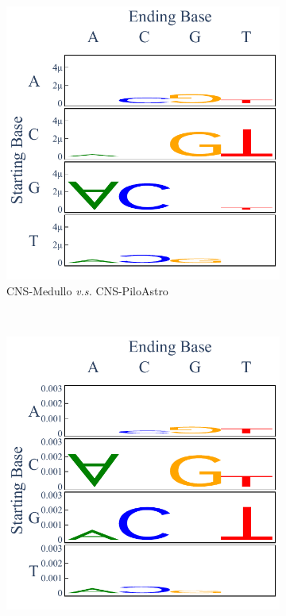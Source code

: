 \begin{figure}[ht!]
    \begin{subfigure}{.5\textwidth}
    \includegraphics[scale=0.7]{graphics/spectra_CNS-Medullo_CNS-PiloAstro.pdf}
    \caption{CNS-Medullo \textit{v.s.} CNS-PiloAstro}
    \label{fig:spectra_medullo_piloastro}
    \end{subfigure}
    ~
    \begin{subfigure}{.5\textwidth}
    \includegraphics[scale=0.7]{graphics/spectra_CNS-PiloAstro_Lymph-BNHL.pdf}

\end{subfigure}
\end{figure}
